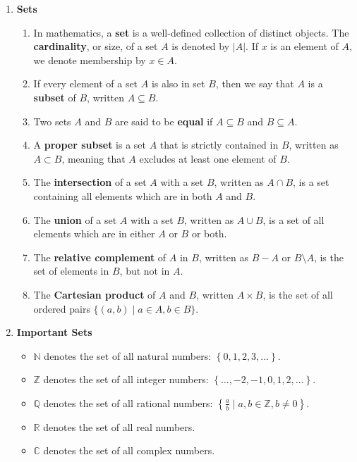 \documentclass[10pt]{article}
\newcommand{\norm}[1]{\lvert #1 \rvert}
\begin{document}
\date{}
\title{\vspace{-5ex}  \vspace{-5ex}}
\maketitle
\begin{multicols}{2}
\begin{enumerate}
    \item \textbf{Sets} 
    \begin{enumerate}
        \item In mathematics, a \textbf{set} is a well-defined collection of distinct objects. The \textbf{cardinality}, or size, of a set $A$ is denoted by $\norm{A}$. If $x$ is an element of $A$, we denote membership by $x \in A$.
         \item If every element of a set $A$ is also in set $B$, then we say that $A$ is a \textbf{subset} of $B$, written $A \subseteq B$. 
         \item Two sets $A$ and $B$ are said to be \textbf{equal} if $A \subseteq B$ and $B \subseteq A$.
         \item A \textbf{proper subset} is a set $A$ that is strictly contained in $B$, written as $A \subset B$, meaning that $A$ excludes at least one element of $B$. 
         \item The \textbf{intersection} of a set $A$ with a set $B$, written as $A \cap B$, is a set containing all elements which are in both $A$ and $B$. 
         \item The \textbf{union} of a set $A$ with a set $B$, written as $A \cup B$, is a set of all elements which are in either $A$ or $B$ or both. 
         \item The \textbf{relative complement} of $A$ in $B$, written as $B - A$ or $B \setminus A$, is the set of elements in $B$, but not in $A$.
         \item The \textbf{Cartesian product} of $A$ and $B$, written $A \times B$, is the set of all ordered pairs $\{(a,b) \mid a \in A, b \in B \}$.
    \end{enumerate}

    
    \item \textbf{Important Sets} 
    \begin{itemize}
        \item $\mathbb{N}$ denotes the set of all natural numbers: $\left\{0,1,2,3,\hdots \right\}$.
        \item $\mathbb{Z}$ denotes the set of all integer numbers: $\left\{\hdots,-2,-1,0,1,2,\hdots\right\}$. 
        \item $\mathbb{Q}$ denotes the set of all rational numbers: $\left\{ \frac{a}{b} \mid a,b \in \mathbb{Z}, b \neq 0 \right\}$.
        \item $\mathbb{R}$ denotes the set of all real numbers.
        \item $\mathbb{C}$ denotes the set of all complex numbers.
    \end{itemize}
    

\end{enumerate}
\end{multicols}
\end{document}
